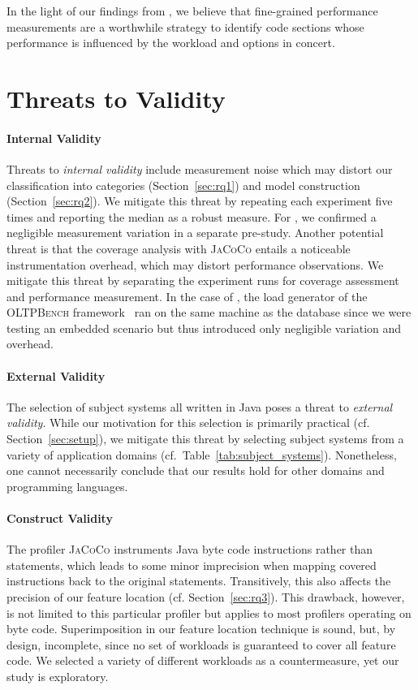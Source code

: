 In the light of our findings from , we believe that fine-grained performance measurements are a worthwhile strategy to identify code sections whose performance is influenced by the workload and options in concert.

\section{Threats to Validity}\label{sec:threats}

\paragraph*{Internal Validity}\label{sec:internal_validity}
Threats to \emph{internal validity} include measurement noise which may distort our classification into categories (Section~\ref{sec:rq1}) and model construction (Section~\ref{sec:rq2}). We mitigate this threat by repeating each experiment five times and reporting the median as a robust measure. For \htwo, we confirmed a negligible measurement variation in a separate pre-study.
Another potential threat is that the coverage analysis with \mbox{\textsc{JaCoCo}} entails a noticeable instrumentation overhead, which may distort performance observations. We mitigate this threat by separating the experiment runs for coverage assessment and performance measurement. In the case of \htwo, the load generator of the \textsc{OLTPBench} framework~\cite{difallah_oltp_2013} ran on the same machine as the database since we were testing an embedded scenario but thus introduced only negligible variation and overhead.

\paragraph*{External Validity}\label{sec:external_validity}
The selection of subject systems all written in Java poses a threat to \emph{external validity}. While our motivation for this selection is primarily practical (cf. Section~\ref{sec:setup}), we mitigate this threat by selecting subject systems from a variety of application domains (cf.~Table~\ref{tab:subject_systems}). Nonetheless, one cannot necessarily conclude that our results hold for other domains and programming languages. 

\paragraph*{Construct Validity}\label{sec:construct_validity}
The profiler \textsc{JaCoCo} instruments Java byte code instructions rather than statements, which leads to some minor imprecision when mapping covered instructions back to the original statements. Transitively, this also affects the precision of our feature location (cf. Section~\ref{sec:rq3}). This drawback, however, is not limited to this particular profiler but applies to most profilers operating on byte code. 
Superimposition in our feature location technique is sound, but, by design, incomplete, since no set of workloads is guaranteed to cover all feature code. We selected a variety of different workloads as a countermeasure, yet our study is exploratory. 

